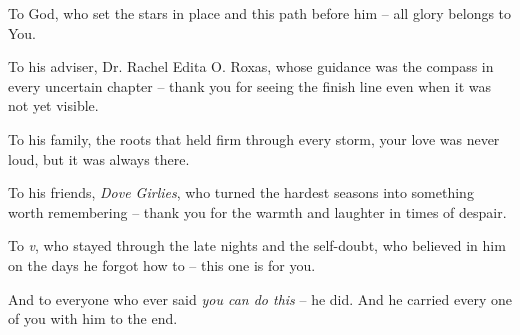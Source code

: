 \documentclass[journal]{./IEEE/IEEEtran}
\begin{document}
To God, who set the stars in place and this path before him -- all glory belongs to You.

To his adviser, Dr. Rachel Edita O. Roxas, whose guidance was the compass in every uncertain chapter -- thank you for seeing the finish line even when it was not yet visible.

To his family, the roots that held firm through every storm, your love was never loud, but it was always there.

To his friends, \textit{Dove Girlies}, who turned the hardest seasons into something worth remembering -- thank you for the warmth and laughter in times of despair.

To \textit{v}, who stayed through the late nights and the self-doubt, who believed in him on the days he forgot how to -- this one is for you.


And to everyone who ever said \textit{you can do this} -- he did. And he carried every one of you with him to the end.
\end{document}
